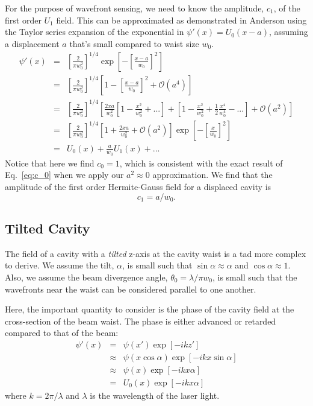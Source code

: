 For the purpose of wavefront sensing, we need to know the amplitude,
$c_1$, of the first order $U_1$ field. This can be approximated as
demonstrated in Anderson \cite{Anderson1984Alignment} using
the Taylor series expansion of the exponential in $\psi \prime(x) =
U_0(x-a)$, assuming a displacement $a$ that's small compared to waist
size $w_0$.
\begin{eqnarray}
\psi \prime(x) &=& \left[ \frac{2}{\pi w_0^2} \right]^{1/4}
\exp{\left[-\left[\frac{x-a}{w_0}\right]^2\right]} \\
&=& \left[ \frac{2}{\pi w_0^2} \right]^{1/4} \left[1 -
  \left[\frac{x-a}{w_0} \right]^2 + \mathcal{O}(a^4) \right] \\
&=& \left[ \frac{2}{\pi w_0^2} \right]^{1/4} \left[ \frac{2xa}{w_0^2}
  \left[1-\frac{x^2}{w_0^2} + ... \right] + \left[ 1 -
    \frac{x^2}{w_0^2} + \frac{1}{2} \frac{x^4}{w_0^4}
    - ... \right] + \mathcal{O}(a^2) \right] \\
&=& \left[ \frac{2}{\pi w_0^2} \right]^{1/4} \left[1 +
  \frac{2xa}{w_0^2} + \mathcal{O}(a^2) \right] \exp{\left[ -\left[\frac{x}{w_0}\right]^2
  \right]} \\
&=& U_0(x) + \frac{a}{w_0} U_1(x) + ...
\end{eqnarray}
Notice that here we find $c_0 = 1$, which is consistent with the
exact result of Eq.~\ref{eq:c_0} when we apply our $a^2 \approx 0$
approximation. We find that the amplitude of the first order
Hermite-Gauss field for a displaced cavity is
\begin{equation}c_1 = a/w_0.
\end{equation}



\subsection{Tilted Cavity}
The field of a cavity with a \emph{tilted} z-axis at the cavity waist is a tad more complex to derive. We assume the tilt, $\alpha$, is small such that $\sin{\alpha} \approx \alpha$ and $\cos{\alpha} \approx 1$. Also, we assume the beam divergence angle, $\theta_0=\lambda / \pi w_0$, is small such that the wavefronts near the waist can be considered parallel to one another. 

Here, the important quantity to consider is the phase of the cavity field at the cross-section of the beam waist.  The phase is either advanced or retarded compared to that of the beam:
\begin{eqnarray}
\psi \prime(x) &=& \psi(x \prime) \exp{[-i k z \prime]} \\
 & \approx& \psi(x \cos{\alpha}) \exp{[-i k x \sin{\alpha}]} \\
 &\approx& \psi(x) \exp{[- i k x \alpha]} \\
 &=& U_0(x) \exp{[- i k x \alpha]}
\label{eq:psi_tilted}
\end{eqnarray}
where $k=2\pi / \lambda$ and $\lambda$ is the wavelength of the laser light.

